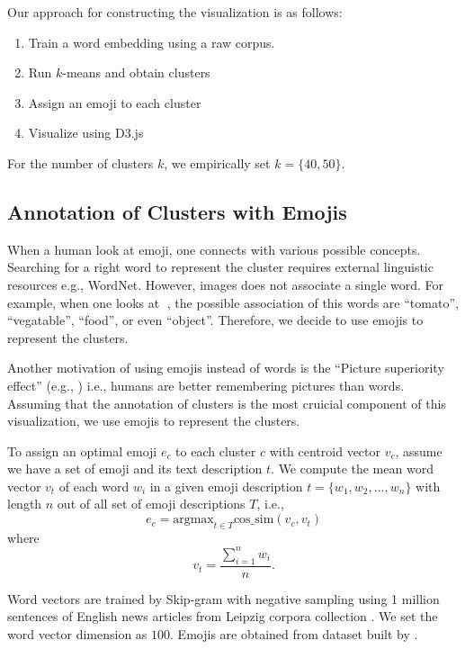 Our approach for constructing the visualization is as follows:
\begin{enumerate}
 \item Train a word embedding using a raw corpus. 
 \item Run $k$-means \cite{lloyd1982least} and obtain clusters
 \item Assign an emoji to each cluster
 \item Visualize using D3.js
\end{enumerate}
For the number of clusters $k$, we empirically set $k = \{40, 50\}$.

\subsection{Annotation of Clusters with Emojis}
When a human look at emoji, one connects with various possible concepts. 
Searching for a right word to represent the cluster requires external linguistic resources e.g., WordNet. 
However, images does not associate a single word. 
For example, when one looks at 🍅, the possible association of this words are ``tomato'', ``vegatable'', ``food'', or even ``object''. 
Therefore, we decide to use emojis to represent the clusters. 

Another motivation of using emojis instead of words is the ``Picture superiority effect'' (e.g., \cite{doi:10.1162/jocn.2010.21464}) i.e., humans are better remembering pictures than words. 
Assuming that the annotation of clusters is the most cruicial component of this visualization, we use emojis to represent the clusters.  

To assign an optimal emoji $e_c$ to each cluster $c$ with centroid vector $v_c$, assume we have a set of emoji and its text description $t$. 
We compute the mean word vector $v_t$ of each word $w_i$ in a given emoji description $t = \{w_1, w_2, ..., w_n\}$ with length $n$ out of all set of emoji descriptions $T$, i.e.,
\begin{equation}
 e_c =  \text{argmax}_{t \in T} \text{cos\_sim}(v_c, v_t)
\end{equation}
where 
\begin{equation}
 v_t = \frac{\sum_{i = 1}^{n} w_i}{n}. 
\end{equation}

Word vectors are trained by Skip-gram with negative sampling \cite{NIPS2013_5021} using 1 million sentences of English news articles from Leipzig corpora collection \cite{Goldhahn12buildinglarge}. We set the word vector dimension as $100$. 
Emojis are obtained from dataset built by \cite{eisner-EtAl:2016:SocialNLP}. 


